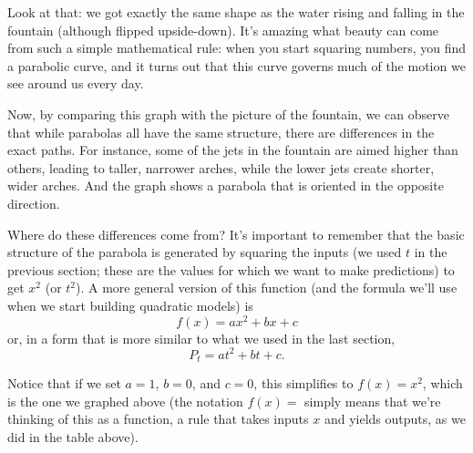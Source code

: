 \begin{center}
\end{center}

Look at that: we got exactly the same shape as the water rising and falling in the fountain (although flipped upside-down).  It's amazing what beauty can come from such a simple mathematical rule: when you start squaring numbers, you find a parabolic curve, and it turns out that this curve governs much of the motion we see around us every day.

Now, by comparing this graph with the picture of the fountain, we can observe that while parabolas all have the same structure, there are differences in the exact paths.  For instance, some of the jets in the fountain are aimed higher than others, leading to taller, narrower arches, while the lower jets create shorter, wider arches.  And the graph shows a parabola that is oriented in the opposite direction.

Where do these differences come from?  It's important to remember that the basic structure of the parabola is generated by squaring the inputs (we used $t$ in the previous section; these are the values for which we want to make predictions) to get $x^2$ (or $t^2$).  A more general version of this function (and the formula we'll use when we start building quadratic models) is
\[f(x) = ax^2 + bx + c\]
or, in a form that is more similar to what we used in the last section,
\[P_t = at^2 + bt + c.\]

Notice that if we set $a=1$, $b=0$, and $c=0$, this simplifies to $f(x) = x^2$, which is the one we graphed above (the notation $f(x)=$ simply means that we're thinking of this as a function, a rule that takes inputs $x$ and yields outputs, as we did in the table above).
\vfill
\pagebreak

